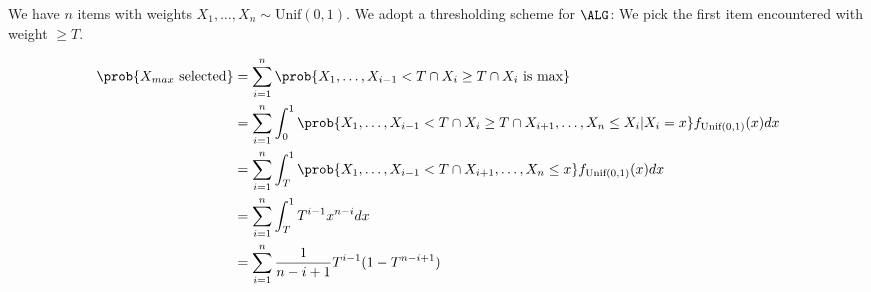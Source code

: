 We have $n$ items with weights $X_1, \dots, X_n \sim \text{Unif}(0,1)$.
We adopt a thresholding scheme for $\ALG$: We pick the first item encountered with weight $\geq T$.

\begin{align*}
\prob{X_{max} \text{ selected}}
&=\sum_{i=1}^n\prob{X_1, \dots, X_{i-1}<T \cap X_i \geq T \cap X_i \text{ is max}}\\
&=\sum_{i=1}^n\int_0^1 \prob{X_1,\dots,X_{i-1}<T\cap X_i\geq T \cap X_{i+1},\dots,X_{n}\leq X_i | X_i = x} f_{\text{Unif}(0,1)}(x) dx\\
&=\sum_{i=1}^n\int_T^1 \prob{X_1,\dots,X_{i-1}<T \cap X_{i+1},\dots,X_n\leq x} f_{\text{Unif}(0,1)}(x) dx\\
&=\sum_{i=1}^n\int_T^1 T^{i-1} x^{n-i} dx\\
&=\sum_{i=1}^n\frac{1}{n-i+1} T^{i-1}(1-T^{n-i+1})
\end{align*}



